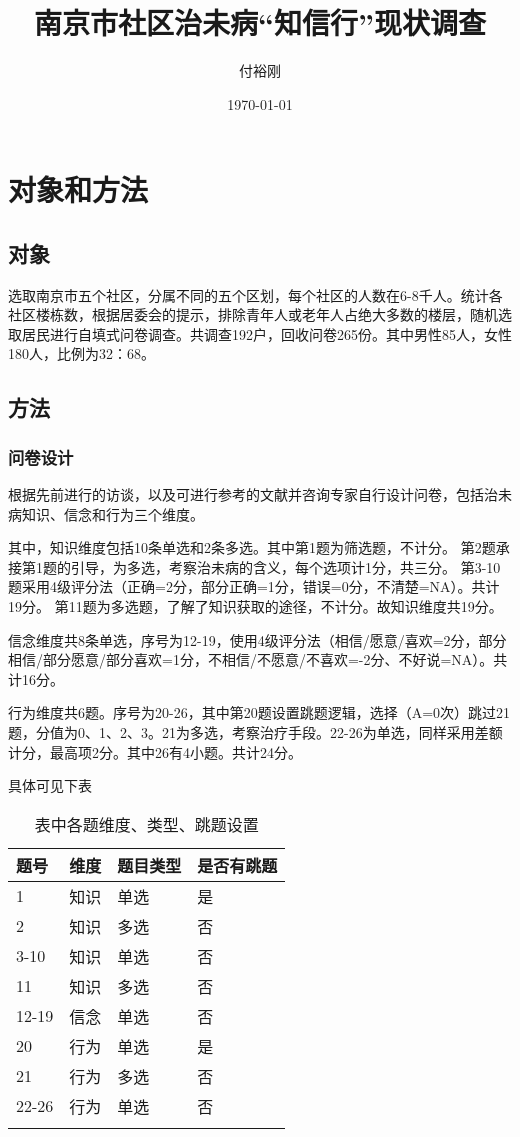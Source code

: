 \documentclass{article}
\title{南京市社区治未病“知信行”现状调查}
\author{付裕刚}
\date{\today}
\begin{document}
    \maketitle
\section{对象和方法}
\subsection{对象}
选取南京市五个社区，分属不同的五个区划，每个社区的人数在6-8千人。统计各社区楼栋数，根据居委会的提示，排除青年人或老年人占绝大多数的楼层，随机选取居民进行自填式问卷调查。共调查192户，回收问卷265份。其中男性85人，女性180人，比例为32：68。
\subsection{方法}
\subsubsection{问卷设计}
根据先前进行的访谈，以及可进行参考的文献\cite{cjw_1_2009}\cite{wcy2011}\cite{kam2005}并咨询专家自行设计问卷，包括治未病知识、信念和行为三个维度。

其中，知识维度包括10条单选和2条多选。其中第1题为筛选题，不计分。
第2题承接第1题的引导，为多选，考察治未病的含义，每个选项计1分，共三分。
第3-10题采用4级评分法（正确=2分，部分正确=1分，错误=0分，不清楚=NA）。共计19分。
第11题为多选题，了解了知识获取的途径，不计分。故知识维度共19分。

信念维度共8条单选，序号为12-19，使用4级评分法（相信/愿意/喜欢=2分，部分相信/部分愿意/部分喜欢=1分，不相信/不愿意/不喜欢=-2分、不好说=NA）。共计16分。

行为维度共6题。序号为20-26，其中第20题设置跳题逻辑，选择（A=0次）跳过21题，分值为0、1、2、3。21为多选，考察治疗手段。22-26为单选，同样采用差额计分，最高项2分。其中26有4小题。共计24分。

具体可见下表
\newpage

\begin{longtable}[]{@{}llll@{}}

题号 & 维度 & 题目类型 & 是否有跳题\tabularnewline
\hline
\endhead
1 & 知识 & 单选 & 是\tabularnewline
2 & 知识 & 多选 & 否\tabularnewline
3-10 & 知识 & 单选 & 否\tabularnewline
11 & 知识 & 多选 & 否\tabularnewline
12-19 & 信念 & 单选 & 否\tabularnewline
20 & 行为 & 单选 & 是\tabularnewline
21 & 行为 & 多选 & 否\tabularnewline
22-26 & 行为 & 单选 & 否\tabularnewline
\hline
\caption{表中各题维度、类型、跳题设置}
\end{longtable}
\end{document}
